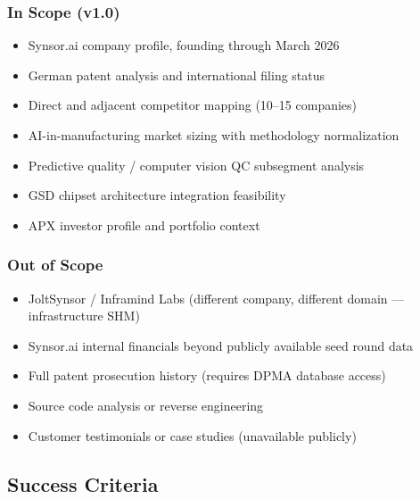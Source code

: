 \documentclass[11pt,letterpaper]{article}
\begin{document}
\subsubsection*{In Scope (v1.0)}
\begin{itemize}[leftmargin=2em]
  \item Synsor.ai company profile, founding through March 2026
  \item German patent analysis and international filing status
  \item Direct and adjacent competitor mapping (10--15 companies)
  \item AI-in-manufacturing market sizing with methodology normalization
  \item Predictive quality / computer vision QC subsegment analysis
  \item GSD chipset architecture integration feasibility
  \item APX investor profile and portfolio context
\end{itemize}

\subsubsection*{Out of Scope}
\begin{itemize}[leftmargin=2em]
  \item JoltSynsor / Inframind Labs (different company, different domain --- infrastructure SHM)
  \item Synsor.ai internal financials beyond publicly available seed round data
  \item Full patent prosecution history (requires DPMA database access)
  \item Source code analysis or reverse engineering
  \item Customer testimonials or case studies (unavailable publicly)
\end{itemize}

\subsection{Success Criteria}
\end{document}
